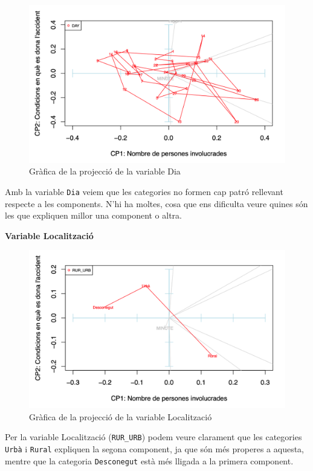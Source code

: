 \documentclass[12pt,longbibliography]{article}
\theoremstyle{definition}
\theoremstyle{remark}
\begin{document}
\begin{figure}[H]
\begin{center}
\includegraphics[width=12cm]{acp7}
\end{center}
\caption{Gràfica de la projecció de la variable Dia}
\label{fig:ACP7}
\end{figure}


Amb la variable \texttt{Dia} veiem que les categories no formen cap patró rellevant respecte a les components. N'hi ha moltes, cosa que ens dificulta veure quines són les que expliquen millor una component o altra.



\textbf{Variable Localització}

\begin{figure}[H]
\begin{center}
\includegraphics[width=12cm]{acp8}
\end{center}
\caption{Gràfica de la projecció de la variable Localització}
\label{fig:ACP8}
\end{figure}


Per la variable Localització (\texttt{RUR\_URB}) podem veure clarament que les categories \texttt{Urbà} i \texttt{Rural} expliquen la segona component, ja que són més properes a aquesta, mentre que la categoria \texttt{Desconegut} està més lligada a la primera component.
\end{document}
